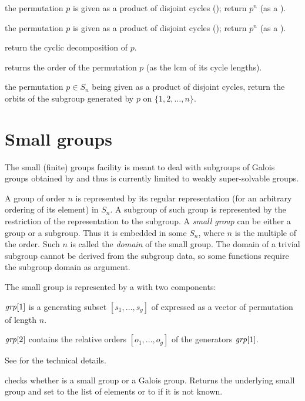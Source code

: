  the permutation $p$ is given as
a product of disjoint cycles (); return $p^n$ (as a ).

 the permutation $p$ is given as
a product of disjoint cycles (); return $p^n$ (as a ).

 return the cyclic decomposition of $p$.

 returns the order of the permutation $p$
(as the lcm of its cycle lengths).

 the permutation $p\in S_n$ being
given as a product of disjoint cycles, return the orbits of the subgroup
generated by $p$ on $\{1,2,\ldots,n\}$.

\section{Small groups}

The small (finite) groups facility is meant to deal with subgroups of Galois
groups obtained by  and thus is currently limited to weakly
super-solvable groups.

A group  of order $n$ is represented by its regular representation
(for an arbitrary ordering of its element) in $S_n$.  A subgroup of such group
is represented by the restriction of the representation to the subgroup.
A \emph{small group} can be either a group or a subgroup. Thus it is embedded
in some $S_n$, where $n$ is the multiple of the order. Such $n$ is called the
\emph{domain} of the small group. The domain of a trivial subgroup cannot be
derived from the subgroup data, so some functions require the subgroup domain
as argument.

The small group  is represented by a  with two
components:

$\hbox{\it grp\/}[1]$ is a generating subset $[s_1,\ldots,s_g]$ of 
expressed as a vector of permutation of length $n$.

$\hbox{\it grp\/}[2]$ contains the relative orders $[o_1,\ldots,o_g]$ of
the generators $\hbox{\it grp\/}[1]$.

See  for the technical details.

 checks whether  is a
small group or a Galois group. Returns the underlying small
group and set  to the list of elements or to  if it is not
known.

